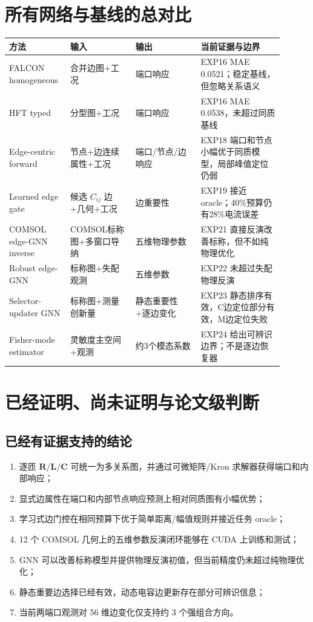 \documentclass[UTF8,11pt,a4paper]{ctexart}
\newcommand{\mat}[1]{\bm{#1}}
\begin{document}
\section{所有网络与基线的总对比}

\begin{longtable}{p{0.17\linewidth}p{0.22\linewidth}p{0.22\linewidth}p{0.29\linewidth}}
\toprule
方法 & 输入 & 输出 & 当前证据与边界\\
\midrule
FALCON homogeneous & 合并边图+工况 & 端口响应 & EXP16 MAE 0.0521；稳定基线，但忽略关系语义\\
HFT typed & 分型图+工况 & 端口响应 & EXP16 MAE 0.0538，未超过同质基线\\
Edge-centric forward & 节点+边连续属性+工况 & 端口/节点/边响应 & EXP18 端口和节点小幅优于同质模型，局部峰值定位仍弱\\
Learned edge gate & 候选 $C_{ij}$ 边+几何+工况 & 边重要性 & EXP19 接近 oracle；40\%预算仍有28\%电流误差\\
COMSOL edge-GNN inverse & COMSOL标称图+多窗口导纳 & 五维物理参数 & EXP21 直接反演改善标称，但不如纯物理优化\\
Robust edge-GNN & 标称图+失配观测 & 五维参数 & EXP22 未超过失配物理反演\\
Selector-updater GNN & 标称图+测量创新量 & 静态重要性+逐边变化 & EXP23 静态排序有效，C边定位部分有效，M边定位失败\\
Fisher-mode estimator & 灵敏度主空间+观测 & 约3个模态系数 & EXP24 给出可辨识边界；不是逐边恢复器\\
\bottomrule
\end{longtable}

\section{已经证明、尚未证明与论文级判断}

\subsection{已经有证据支持的结论}
\begin{enumerate}
  \item 逐匝 $\mat R/\mat L/\mat C$ 可统一为多关系图，并通过可微矩阵/Kron 求解器获得端口和内部响应；
  \item 显式边属性在端口和内部节点响应预测上相对同质图有小幅优势；
  \item 学习式边门控在相同预算下优于简单距离/幅值规则并接近任务 oracle；
  \item 12 个 COMSOL 几何上的五维参数反演闭环能够在 CUDA 上训练和测试；
  \item GNN 可以改善标称模型并提供物理反演初值，但当前精度仍未超过纯物理优化；
  \item 静态重要边选择已经有效，动态电容边更新存在部分可辨识信息；
  \item 当前两端口观测对 56 维边变化仅支持约 3 个强组合方向。
\end{enumerate}
\end{document}
